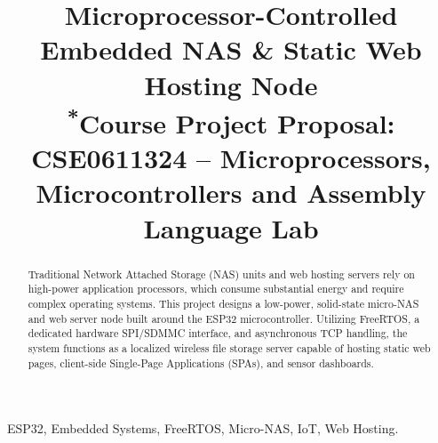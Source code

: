 \documentclass[conference]{IEEEtran}
\begin{document}
\title{Microprocessor-Controlled Embedded NAS \& Static Web Hosting Node\\
{\footnotesize \textsuperscript{*}Course Project Proposal: CSE0611324 -- Microprocessors, Microcontrollers and Assembly Language Lab}}

\author{
\and
{}
\and
{}
}

\maketitle

\begin{abstract}
Traditional Network Attached Storage (NAS) units and web hosting servers rely on high-power application processors, which consume substantial energy and require complex operating systems. This project designs a low-power, solid-state micro-NAS and web server node built around the ESP32 microcontroller. Utilizing FreeRTOS, a dedicated hardware SPI/SDMMC interface, and asynchronous TCP handling, the system functions as a localized wireless file storage server capable of hosting static web pages, client-side Single-Page Applications (SPAs), and sensor dashboards.
\end{abstract}

\begin{IEEEkeywords}
ESP32, Embedded Systems, FreeRTOS, Micro-NAS, IoT, Web Hosting.
\end{IEEEkeywords}
\end{document}

